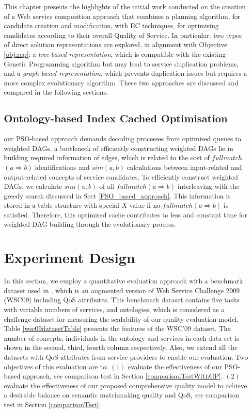 This chapter presents the highlights of the initial work conducted on the creation of a Web service composition approach that combines a planning algorithm, for candidate creation and modification, with EC techniques, for optimising candidates according to their overall Quality of Service. In particular, two types of direct solution representations are explored, in alignment with Objective \ref{obj:rep}: a \textit{tree-based representation}, which is compatible with the existing Genetic Programming algorithm but may lead to service duplication problems, and a \textit{graph-based representation}, which prevents duplication issues but requires a more complex evolutionary algorithm. These two approaches are discussed and compared in the following sections.



\subsection{Ontology-based Index Cached Optimisation}\label{indexCache}
our PSO-based approach demands decoding processes from optimised queues to weighted DAGs, a bottleneck of efficiently constructing weighted DAGs lie in building required information of edges, which is related to the cost of $fullmatch$
$(a \Rightarrow b)$ identifications and $sim(a, b)$ calculations between input-related and output-related concepts of service candidates. To efficiently construct weighted DAGs, we calculate $sim(a, b)$ of all $fullmatch(a \Rightarrow b)$ interleaving with the greedy search discussed in Sect \ref{PSO_based_approach}. This information is stored in a table structure with special $X$ value if no $fullmatch(a \Rightarrow b)$ is satisfied. Therefore, this optimised cache contributes to less and constant time for weighted DAG building through the evolutionary process.

\section{Experiment Design}\label{experiment_design}
In this section, we employ a quantitative evaluation approach with a benchmark dataset used in \cite{ma2015hybrid,da2016genetic}, which is an augmented version of Web Service Challenge 2009 (WSC09) including QoS attributes. This benchmark dataset contains five tasks with variable numbers of services, and ontologies, which is considered as a challenge dataset for measuring the scalability of our quality evaluation model. Table \ref{wsc09datasetTable} presents the features of the WSC’09 dataset. The number of concepts, individuals in the ontology and services in each data set is shown in the second, third, fourth column respectively. Also, we extend all the datasets with QoS attributes from service providers to enable our evaluation.  Two objectives of this evaluation are to: $(1)$ evaluate the effectiveness of our PSO-based approach, see comparison test in Section \ref{comparisonTestWithGP}.
$(2)$ evaluate the effectiveness of our proposed comprehensive quality model to achieve a desirable balance on semantic matchmaking quality and QoS, see comparison test in Section \ref{comparisonTest}.

